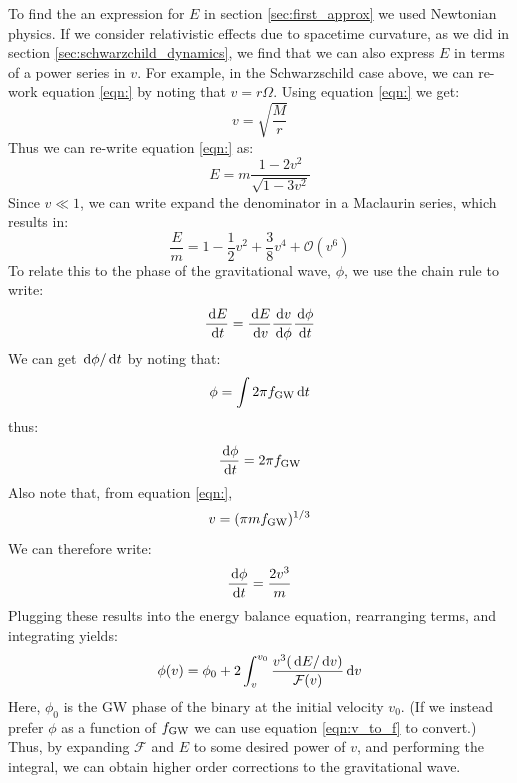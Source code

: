 To find the an expression for $E$ in section \ref{sec:first_approx} we used Newtonian physics. If we consider relativistic effects due to spacetime curvature, as we did in section \ref{sec:schwarzchild_dynamics}, we find that we can also express $E$ in terms of a power series in $v$. For example, in the Schwarzschild case above, we can re-work equation \ref{eqn:} by noting that $v = r\Omega$. Using equation \ref{eqn:} we get:
\begin{equation}
v = \sqrt{\frac{M}{r}}
\end{equation}
Thus we can re-write equation \ref{eqn:} as:
\begin{equation}
E = m \frac{1-2v^2}{\sqrt{1-3v^2}}
\end{equation}
Since $v \ll 1$, we can write expand the denominator in a Maclaurin series, which results in:
\begin{equation}
\frac{E}{m} = 1 - \frac{1}{2}v^2 + \frac{3}{8}v^4 + \mathcal{O}(v^6)
\end{equation}
To relate this to the phase of the gravitational wave, $\phi$, we use the chain rule to write:
\begin{equation}
\frac{\,\mathrm{d} E}{\,\mathrm{d} t} = \frac{\,\mathrm{d} E}{\,\mathrm{d} v}\frac{\,\mathrm{d} v}{\,\mathrm{d} \phi}\frac{\,\mathrm{d} \phi}{\,\mathrm{d} t}
\end{equation}
We can get $\,\mathrm{d} \phi / \,\mathrm{d} t$ by noting that:
\begin{equation}
\phi = \int 2\pi f_{\mathrm{GW}} \,\mathrm{d} t
\end{equation}
thus:
\begin{equation}
\frac{\,\mathrm{d} \phi}{\,\mathrm{d} t} = 2\pi f_{\mathrm{GW}}
\end{equation}
Also note that, from equation \ref{eqn:},
\begin{equation}
\label{eqn:v_to_f}
v = (\pi m \fGW)^{1/3}
\end{equation}
We can therefore write:
\begin{equation}
\frac{\,\mathrm{d} \phi}{\,\mathrm{d} t} = \frac{2 v^3}{m}
\end{equation}
Plugging these results into the energy balance equation, rearranging terms, and integrating yields:
\begin{equation}
\phi(v) = \phi_0 + 2\int_{v}^{v_0} \frac{v^3 (\,\mathrm{d} E/\,\mathrm{d} v)}{\mathcal{F}(v)} \,\mathrm{d} v
\end{equation}
Here, $\phi_0$ is the \ac{GW} phase of the binary at the initial velocity $v_0$. (If we instead prefer $\phi$ as a function of $f_{\mathrm{GW}}$ we can use equation \ref{eqn:v_to_f} to convert.) Thus, by expanding $\mathcal{F}$ and $E$ to some desired power of $v$, and performing the integral, we can obtain higher order corrections to the gravitational wave.

